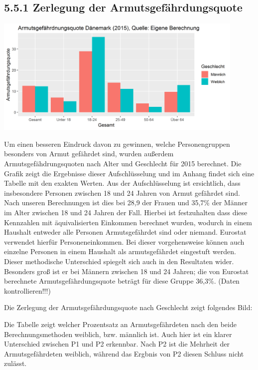\documentclass[12pt,]{article}
\let\origfigure\figure
\let\endorigfigure\endfigure
\renewenvironment{figure}[1][2] {
        \expandafter\origfigure\expandafter[H]
      } {\endorigfigure}
\begin{document}
\subsection{5.5.1 Zerlegung der
Armutsgefährdungsquote}\label{zerlegung-der-armutsgefahrdungsquote}

\begin{figure}
\centering
\includegraphics[width=0.90000\textwidth]{img/arpr_barplot.png}
\caption{Armutsgefährdungsquote 2015}
\end{figure}

Um einen besseren Eindruck davon zu gewinnen, welche Personengruppen
besonders von Armut gefährdet sind, wurden außerdem
Armutsgefähdrungsquoten nach Alter und Geschlecht für 2015 berechnet.
Die Grafik zeigt die Ergebnisse dieser Aufschlüsselung und im Anhang
findet sich eine Tabelle mit den exakten Werten. Aus der Aufschlüsselung
ist ersichtlich, dass insbesondere Personen zwischen 18 und 24 Jahren
von Armut gefährdet sind. Nach unseren Berechnungen ist dies bei 28,9
der Frauen und 35,7\% der Männer im Alter zwischen 18 und 24 Jahren der
Fall. Hierbei ist festzuhalten dass diese Kennzahlen mit äquivalisierten
Einkommen berechnet wurden, wodurch in einem Haushalt entweder alle
Personen Armutsgefährdet sind oder niemand. Eurostat verwendet hierfür
Personeneinkommen. Bei dieser vorgehensweise können auch einzelne
Personen in einem Haushalt als armutsgefährdet eingestuft werden. Dieser
methodische Unterschied spiegelt sich auch in den Resultaten wider.
Besonders groß ist er bei Männern zwischen 18 und 24 Jahren; die von
Eurostat berechnete Armutsgefährdungsquote beträgt für diese Gruppe
36,3\%. (Daten kontrollieren!!!)

Die Zerlegung der Armutsgefährdungsquote nach Geschlecht zeigt folgendes
Bild:

Die Tabelle zeigt welcher Prozentsatz an Armutsgefährdeten nach den
beide Berechnungsmethoden weiblich, bzw. männlich ist. Auch hier ist ein
klarer Unterschied zwischen P1 und P2 erkennbar. Nach P2 ist die
Mehrheit der Armutsgefährdeten weiblich, während das Ergbnis von P2
diesen Schluss nicht zulässt.
\end{document}
